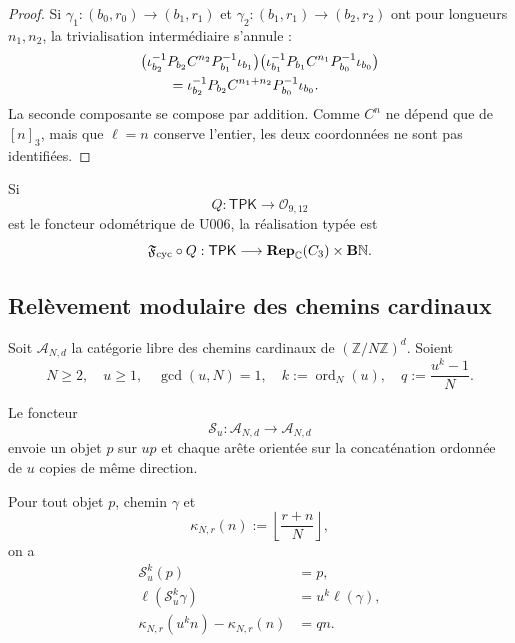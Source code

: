 {\begin{proof}
Si \(\gamma_1:(b_0,r_0)\to(b_1,r_1)\) et
\(\gamma_2:(b_1,r_1)\to(b_2,r_2)\) ont pour longueurs \(n_1,n_2\), la
trivialisation intermédiaire s’annule :
\begin{align}
 &\bigl(
 \iota_{b_2}^{-1}P_{b_2}C^{n_2}P_{b_1}^{-1}\iota_{b_1}
 \bigr)
 \bigl(
 \iota_{b_1}^{-1}P_{b_1}C^{n_1}P_{b_0}^{-1}\iota_{b_0}
 \bigr)\notag\\
 &\qquad=
 \iota_{b_2}^{-1}P_{b_2}C^{n_1+n_2}
 P_{b_0}^{-1}\iota_{b_0}.
 \label{p12-83-c1-s10:eq:u006b-composicion-funtor}
\end{align}
La seconde composante se compose par addition. Comme \(C^n\) ne dépend que de
\([n]_3\), mais que \(\ell=n\) conserve l’entier, les deux coordonnées ne sont pas
identifiées.
\end{proof}

Si
\[
 Q:\mathsf{TPK}\longrightarrow\mathcal O_{9,12}
\]
est le foncteur odométrique de U006, la réalisation typée est
\begin{equation}
 \mathfrak F_{\rm cyc}\circ Q:
 \mathsf{TPK}\longrightarrow
 \mathbf{Rep}_{\mathbb C}(C_3)\times\mathbf B\mathbb N.
 \label{p12-83-c1-s10:eq:u006b-compuesto-tpk-ciclotomico}
\end{equation}

\subsection{Relèvement modulaire des chemins cardinaux}

Soit \(\mathcal A_{N,d}\) la catégorie libre des chemins cardinaux de
\((\mathbb Z/N\mathbb Z)^d\). Soient
\[
 N\ge2,\quad u\ge1,\quad\gcd(u,N)=1,
 \quad k:=\operatorname{ord}_N(u),
 \quad q:=\frac{u^k-1}{N}.
\]

\begin{definition}
\label{p12-83-c1-s10:def:u006b-sustitucion-cardinal}
Le foncteur
\[
 \mathcal S_u:\mathcal A_{N,d}\longrightarrow\mathcal A_{N,d}
\]
envoie un objet \(p\) sur \(up\) et chaque arête orientée sur la concaténation
ordonnée de \(u\) copies de même direction.
\end{definition}

\begin{theorem}
\label{p12-83-c1-s10:thm:u006b-elevacion-modular}
Pour tout objet \(p\), chemin \(\gamma\) et
\[
 \kappa_{N,r}(n):=
 \left\lfloor\frac{r+n}{N}\right\rfloor,
\]
on a
\begin{align}
 \mathcal S_u^k(p)&=p,
 \label{p12-83-c1-s10:eq:u006b-retorno-objetos}\\
 \ell(\mathcal S_u^k\gamma)&=u^k\ell(\gamma),
 \label{p12-83-c1-s10:eq:u006b-longitud-sustituida}\\
 \kappa_{N,r}(u^kn)-\kappa_{N,r}(n)&=qn.
 \label{p12-83-c1-s10:eq:u006b-diferencia-vueltas}
\end{align}
\end{theorem}

}
